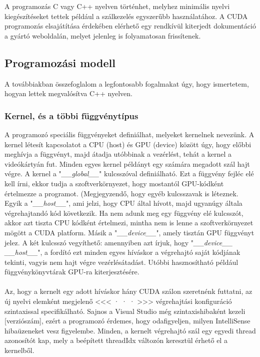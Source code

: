 A programozás C vagy C++ nyelven történhet, melyhez minimális nyelvi kiegészítéseket tettek például a szálkezelés egyszerűbb használatához. A CUDA programozás elsajátítása érdekében elérhető egy rendkívül kiterjedt dokumentáció a gyártó weboldalán, melyet jelenleg is folyamatosan frissítenek. \cite{CUDAdoc}

\subsection{Programozási modell }
A továbbiakban összefoglalom a legfontosabb fogalmakat úgy, hogy ismertetem, hogyan lettek megvalósítva C++ nyelven.

\subsubsection{Kernel, és a többi függvénytípus}
A programozó speciális függvényeket definiálhat, melyeket kernelnek nevezünk. A kernel létesít kapcsolatot a CPU (host) és GPU (device) között úgy, hogy előbbi meghívja a függvényt, majd átadja utóbbinak a vezérlést, tehát a kernel a videókártyán fut. Minden egyes kernel példányt egy számára megadott szál hajt végre.
A kernel a "\textit{\_\_global\_\_}" kulcsszóval definiálható. Ezt a függvény fejléc elé kell írni, ekkor tudja a szoftverkörnyezet, hogy mostantól GPU-kódként értelmezze a programot. 
(Megjegyzendő, hogy egyéb kulcsszavak is léteznek. Egyik a "\textit{\_\_host\_\_}", ami jelzi, hogy CPU által hívott, majd ugyanúgy általa végrehajtandó kód következik. Ha nem adunk meg egy függvény elé kulcsszót, akkor azt tiszta CPU kódként értelmezi, mintha nem is lenne a szoftverkörnyezet mögött a CUDA platform. Másik a "\textit{\_\_device\_\_}", amely tisztán GPU függvényt jelez. A két kulcsszó vegyíthető: amennyiben azt írjuk, hogy "\textit{\_\_device\_\_ \_\_host\_\_}", a fordító ezt minden egyes híváskor a végrehajtó saját kódjának tekinti, vagyis nem hajt végre vezérlésátadást. Utóbbi hasznosítható például függvénykönyvtárak GPU-ra kiterjesztésére.
\paragraph{}
Az, hogy a kernelt egy adott híváskor hány CUDA szálon szeretnénk futtatni, az új nyelvi elemként megjelenő <<< · · · >>> végrehajtási konfiguráció szintaxissal specifikálható. Sajnos a Visual Studio még szintaxishibaként kezeli [verziószám], ezért a programozó érdemes, hogy odafigyeljen, milyen IntelliSense hibaüzeneket vesz figyelembe. Minden, a kernelt végrehajtó szál egy egyedi thread azonosítót kap, mely a beépített threadIdx változón keresztül érhető el a kernelből.
